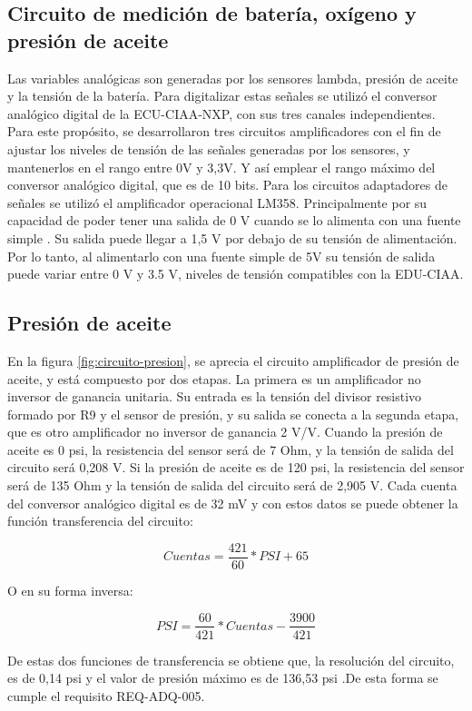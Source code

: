 \subsection{Circuito de medición de batería, oxígeno y presión de aceite}

Las variables analógicas son generadas por los sensores lambda, presión de aceite y la tensión de la batería. Para digitalizar estas señales se utilizó el conversor analógico digital de la ECU-CIAA-NXP, con sus tres canales independientes. Para este propósito, se desarrollaron tres circuitos amplificadores con el fin de ajustar los niveles de tensión de las señales generadas por los sensores, y mantenerlos en el rango entre 0V y 3,3V. Y así emplear el rango máximo del conversor analógico digital, que es de 10 bits. Para los circuitos adaptadores de señales se utilizó el amplificador operacional LM358. Principalmente por su capacidad de poder tener una salida de 0 V cuando se lo alimenta con una fuente simple \cite{lm358}. Su salida puede llegar a 1,5 V por debajo de su tensión de alimentación. Por lo tanto, al alimentarlo con una fuente simple de 5V su tensión de salida puede variar entre 0 V y 3.5 V, niveles de tensión compatibles con la EDU-CIAA.

\subsection{Presión de aceite}

En la figura \ref{fig:circuito-presion}, se aprecia el circuito amplificador de presión de aceite, y está compuesto por dos etapas. La primera es un amplificador no inversor de ganancia unitaria. Su entrada es la tensión del divisor resistivo formado por R9 y el sensor de presión, y su salida se conecta a la segunda etapa, que es otro amplificador no inversor de ganancia 2 V/V.
Cuando la presión de aceite es 0 psi, la resistencia del sensor será de 7 Ohm, y la tensión de salida del circuito será 0,208 V. Si la presión de aceite es de 120 psi, la resistencia del sensor será de 135 Ohm y la tensión de salida del circuito será de 2,905 V. Cada cuenta del conversor analógico digital es de 32 mV y con estos datos se puede obtener la función transferencia del circuito:

\[ Cuentas = \frac{421}{60} * PSI + 65\]

O en su forma inversa:

\[ PSI = \frac{60}{421} * Cuentas - \frac{3900}{421} \]

De estas dos funciones de transferencia se obtiene que, la resolución del circuito, es de 0,14 psi y el valor de presión máximo es de 136,53 psi .De esta forma se cumple el requisito REQ-ADQ-005.

